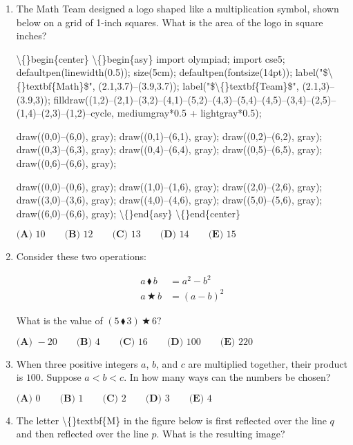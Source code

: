 \documentclass{article}
\begin{document}
\begin{enumerate}[label=\arabic*., itemsep=0.5em]\item The Math Team designed a logo shaped like a multiplication symbol, shown below on a grid of 1-inch squares. What is the area of the logo in square inches?


\textbackslash\{\}begin\{center\}
\textbackslash\{\}begin\{asy\}
import olympiad;
import cse5;
defaultpen(linewidth(0.5));
size(5cm);
defaultpen(fontsize(14pt));
label("\$\textbackslash\{\}textbf\{Math\}\$", (2.1,3.7)--(3.9,3.7));
label("\$\textbackslash\{\}textbf\{Team\}\$", (2.1,3)--(3.9,3));
filldraw((1,2)--(2,1)--(3,2)--(4,1)--(5,2)--(4,3)--(5,4)--(4,5)--(3,4)--(2,5)--(1,4)--(2,3)--(1,2)--cycle, mediumgray*0.5 + lightgray*0.5);

draw((0,0)--(6,0), gray);
draw((0,1)--(6,1), gray);
draw((0,2)--(6,2), gray);
draw((0,3)--(6,3), gray);
draw((0,4)--(6,4), gray);
draw((0,5)--(6,5), gray);
draw((0,6)--(6,6), gray);

draw((0,0)--(0,6), gray);
draw((1,0)--(1,6), gray);
draw((2,0)--(2,6), gray);
draw((3,0)--(3,6), gray);
draw((4,0)--(4,6), gray);
draw((5,0)--(5,6), gray);
draw((6,0)--(6,6), gray);
\textbackslash\{\}end\{asy\}
\textbackslash\{\}end\{center\}


\(\textbf{(A) } 10 \qquad \textbf{(B) } 12 \qquad \textbf{(C) } 13 \qquad \textbf{(D) } 14 \qquad \textbf{(E) } 15\)\par \vspace{0.5em}\item Consider these two operations:

\begin{align*}
a \, \blacklozenge \, b &= a^2 - b^2\\
a \, \bigstar \, b &= (a - b)^2
\end{align*}

What is the value of \((5 \, \blacklozenge \, 3) \, \bigstar \, 6?\)

\(\textbf{(A) } {-}20 \qquad \textbf{(B) } 4 \qquad \textbf{(C) } 16 \qquad \textbf{(D) } 100 \qquad \textbf{(E) } 220\)\par \vspace{0.5em}\item When three positive integers \(a\), \(b\), and \(c\) are multiplied together, their product is \(100\). Suppose \(a < b < c\). In how many ways can the numbers be chosen?

\(\textbf{(A) } 0 \qquad \textbf{(B) } 1\qquad\textbf{(C) } 2\qquad\textbf{(D) } 3\qquad\textbf{(E) } 4\)\par \vspace{0.5em}\item The letter \textbackslash\{\}textbf\{M\} in the figure below is first reflected over the line \(q\) and then reflected over the line \(p\). What is the resulting image?



\end{enumerate}
\end{document}

